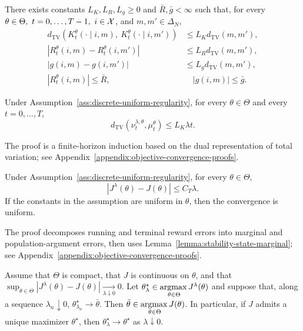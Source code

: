 \begin{assumption}
    \label{ass:discrete-uniform-regularity}
    There exists constants $L_K,L_R,L_g\geq0$ and $\bar R,\bar g<\infty$ such that, for every $\theta\in\Theta,\ t=0,\ldots,T-1,\ i\in\Xc$, and $m,m'\in\Delta_N$,
    \begin{align}
        d_\mathrm{TV}\left(K_t^\theta(\cdot\mid i,m),\ K_t^\theta(\cdot\mid i,m') \right)
        &\leq L_K d_\mathrm{TV}(m,m'), \\
        |R_t^\theta(i,m) - R_t^\theta(i,m')|
        &\leq L_R d_\mathrm{TV}(m,m'), \\
        |g(i,m) - g(i,m')|
        &\leq L_g d_\mathrm{TV}(m,m'), \\
        |R_t^\theta(i,m)|\leq \bar R,&\quad |g(i,m)|\leq\bar g.
    \end{align}
\end{assumption}

\begin{lemma}
    \label{lemma:stability-state-marginal}
    Under Assumption~\ref{ass:discrete-uniform-regularity}, for every $\theta\in\Theta$ and every $t=0,\ldots,T$, $$d_\mathrm{TV}(\nu_t^{\lambda,\theta},\mu_t^\theta)\leq L_K\lambda t.$$
\end{lemma}

The proof is a finite-horizon induction based on the dual representation of total variation; see Appendix~\ref{appendix:objective-convergence-proofs}.

\begin{theorem}
    \label{theorem:discrete-convergence-objective}
    Under Assumption~\ref{ass:discrete-uniform-regularity}, for every $\theta\in\Theta$, $$|J^\lambda(\theta) - J(\theta)|\leq C_T\lambda.$$
    If the constants in the assumption are uniform in $\theta$, then the convergence is uniform.
\end{theorem}

The proof decomposes running and terminal reward errors into marginal and population-argument errors, then uses Lemma~\ref{lemma:stability-state-marginal}; see Appendix~\ref{appendix:objective-convergence-proofs}.

\begin{corollary}
    \label{cor:discrete-optimizer-consistency}
    Assume that $\Theta$ is compact, that $J$ is continuous on $\theta$, and that $\sup_{\theta\in\Theta} |J^\lambda(\theta) - J(\theta)|\xrightarrow[\lambda\downarrow0]{}0$. Let $\theta_\lambda^\star\in\argmax_{\theta\in\Theta} J^\lambda(\theta)$ and suppose that, along a sequence $\lambda_n\downarrow0$, $\theta_{\lambda_n}^\star \to \bar \theta$. Then $\bar \theta \in \argmax_{\theta\in\Theta}J(\theta)$.
    In particular, if $J$ admits a unique maximizer $\theta^\star$, then $\theta_\lambda^\star \to \theta^\star$ as $\lambda\downarrow0$.
\end{corollary}

